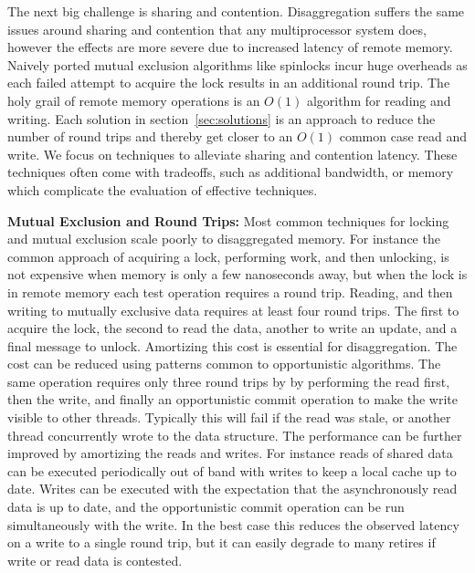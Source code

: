The next big challenge is sharing and contention. Disaggregation suffers the
same issues around sharing and contention that any multiprocessor system does,
however the effects are more severe due to increased latency of remote memory.
Naively ported mutual exclusion algorithms like spinlocks incur huge overheads
as each failed attempt to acquire the lock results in an additional round trip.
The holy grail of remote memory operations is an $O(1)$ algorithm for reading
and writing. Each solution in section~\ref{sec:solutions} is an approach to
reduce the number of round trips and thereby get closer to an $O(1)$ common case
read and write.  We focus on techniques to alleviate sharing and contention
latency. These techniques often come with tradeoffs, such as additional
bandwidth, or memory which complicate the evaluation of effective techniques.

\textbf{Mutual Exclusion and Round Trips:} 
Most common techniques for locking and mutual exclusion scale poorly to
disaggregated memory. For instance the common approach of acquiring a lock,
performing work, and then unlocking, is not expensive when memory is only a few
nanoseconds away, but when the lock is in remote memory each test operation
requires a round trip.  Reading, and then writing to mutually exclusive data
requires at least four round trips. The first to acquire the lock, the second to
read the data, another to write an update, and a final message to unlock.
Amortizing this cost is essential for disaggregation. The cost can be reduced
using patterns common to opportunistic algorithms. The same operation requires
only three round trips by by performing the read first, then the write, and
finally an opportunistic commit operation to make the write visible to other
threads. Typically this will fail if the read was stale, or another thread
concurrently wrote to the data structure. The performance can be further
improved by amortizing the reads and writes. For instance reads of shared data
can be executed periodically out of band with writes to keep a local cache up to
date.  Writes can be executed with the expectation that the asynchronously read
data is up to date, and the opportunistic commit operation can be run
simultaneously with the write. In the best case this reduces the observed
latency on a write to a single round trip, but it can easily degrade to many
retires if write or read data is contested. 




